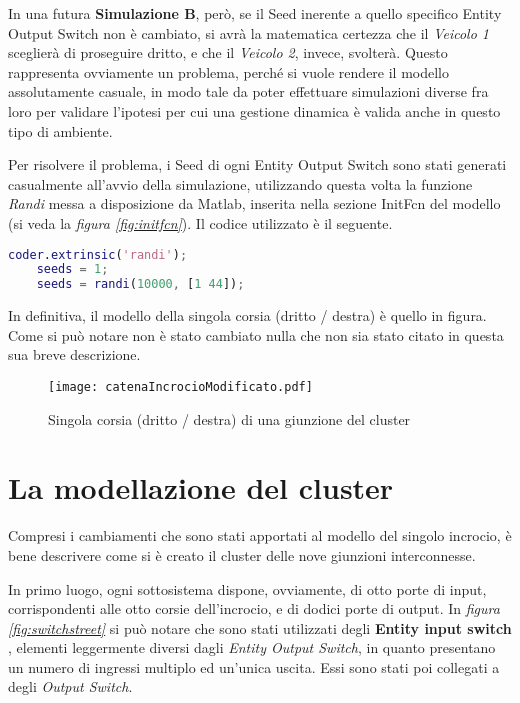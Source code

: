 In una futura \textbf{Simulazione B}, però, se il Seed inerente a quello specifico Entity Output Switch non è cambiato, si avrà la matematica certezza che il \textit{Veicolo 1} sceglierà di proseguire dritto, e che il \textit{Veicolo 2}, invece, svolterà. Questo rappresenta ovviamente un problema, perché si vuole rendere il modello assolutamente casuale, in modo tale da poter effettuare simulazioni diverse fra loro per validare l'ipotesi per cui una gestione dinamica è valida anche in questo tipo di ambiente.
\newline

Per risolvere il problema, i Seed di ogni Entity Output Switch sono stati generati casualmente all'avvio della simulazione, utilizzando questa volta la funzione \textit{Randi} messa a disposizione da Matlab, inserita nella sezione InitFcn del modello (si veda la \textit{figura \ref{fig:initfcn}}).
Il codice utilizzato è il seguente.
\newline
\begin{lstlisting}[language=Matlab,label=seedgen,caption=Generazione Casuale dei Seed]
    coder.extrinsic('randi');
	seeds = 1;
	seeds = randi(10000, [1 44]); 
\end{lstlisting}

In definitiva, il modello della singola corsia (dritto / destra) è quello in figura. Come si può notare non è stato cambiato nulla che non sia stato citato in questa sua breve descrizione. 

\begin{figure}[H]
  \texttt{[image: catenaIncrocioModificato.pdf]}
  \caption{Singola corsia (dritto / destra) di una giunzione del cluster}
  \label{fig:}
\end{figure}

\newpage
\section{La modellazione del cluster}
Compresi i cambiamenti che sono stati apportati al modello del singolo incrocio, è bene descrivere come si è creato il cluster delle nove giunzioni interconnesse.

In primo luogo, ogni sottosistema dispone, ovviamente, di otto porte di input, corrispondenti alle otto corsie dell'incrocio, e di dodici porte di output. In \textit{figura \ref{fig:switchstreet}} si può notare che sono stati utilizzati degli \textbf{Entity input switch \cite{inpswitch}}, elementi leggermente diversi dagli \textit{Entity Output Switch}, in quanto presentano un numero di ingressi multiplo ed un'unica uscita. Essi sono stati poi collegati a degli \textit{Output Switch}.

